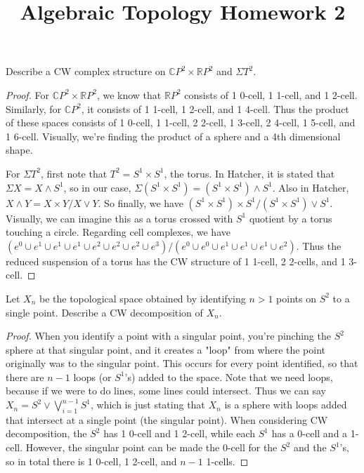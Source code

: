 \documentclass[12pt]{article}
\newenvironment{statement}[2][Statement]{\begin{trivlist}
\item[\hskip \labelsep {\bfseries #1}\hskip \labelsep {\bfseries #2.}]}{\end{trivlist}}
\begin{document}
 
\title{Algebraic Topology Homework 2} 
\maketitle

\begin{statement}[Exercise]{1}
    Describe a CW complex structure on $\mathbb{C}P^2 \times \mathbb{R}P^2$ and $\Sigma T^2$.
\end{statement}
\begin{proof}
    For $\mathbb{C}P^2 \times \mathbb{R}P^2$, we know that $\mathbb{R}P^2$ consists of 1 0-cell, 1 1-cell, and 1 2-cell. Similarly, for $\mathbb{C}P^2$, it consists of 1 1-cell, 1 2-cell, and 1 4-cell. Thus the product of these spaces consists of 1 0-cell, 1 1-cell, 2 2-cell, 1 3-cell, 2 4-cell, 1 5-cell, and 1 6-cell. Visually, we're finding the product of a sphere and a 4th dimensional shape.
    \par For $\Sigma T^2$, first note that $T^2 = S^1 \times S^1$, the torus. In Hatcher, it is stated that $\Sigma X = X \wedge S^1$, so in our case, $\Sigma (S^1 \times S^1) = (S^1 \times S^1) \wedge S^1$. Also in Hatcher, $ X \wedge Y = X \times Y / X \vee Y$. So finally, we have $ (S^1 \times S^1) \times S^1 / (S^1 \times S^1) \vee S^1$. Visually, we can imagine this as a torus crossed with $S^1$ quotient by a torus touching a circle. Regarding cell complexes, we have $(e^0 \cup e^1 \cup e^1 \cup e^1 \cup e^2 \cup e^2 \cup e^2 \cup e^3) / (e^0 \cup e^0 \cup e^1 \cup e^1 \cup e^1 \cup e^2)$. Thus the reduced suspension of a torus has the CW structure of 1 1-cell, 2 2-cells, and 1 3-cell.
\end{proof}

\begin{statement}[Exercise]{2}
    Let $X_n$ be the topological space obtained by identifying $n > 1$ points on $S^2$ to a single point. Describe a CW decomposition of $X_n$.
\end{statement}
\begin{proof}
    When you identify a point with a singular point, you're pinching the $S^2$ sphere at that singular point, and it creates a "loop" from where the point originally was to the singular point. This occurs for every point identified, so that there are $n-1$ loops (or $S^1$'s) added to the space. Note that we need loops, because if we were to do lines, some lines could intersect. Thus we can say $X_n = S^2 \vee \bigvee_{i=1}^{n-1} S^1$, which is just stating that $X_n$ is a sphere with loops added that intersect at a single point (the singular point). When considering CW decomposition, the $S^2$ has 1 0-cell and 1 2-cell, while each $S^1$ has a 0-cell and a 1-cell. However, the singular point can be made the 0-cell for the $S^2$ and the $S^1$'s, so in total there is 1 0-cell, 1 2-cell, and $n-1$ 1-cells. 
\end{proof}
\end{document}
